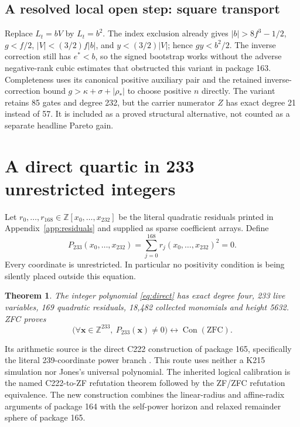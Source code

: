 \documentclass[10pt,letterpaper]{article}
\newcommand{\Z}{\mathbb Z}
\newcommand{\Con}{\operatorname{Con}}
\newtheorem{theorem}{Theorem}[section]
\theoremstyle{remark}\newtheorem{remark}[theorem]{Remark}
\begin{document}
\subsection{A resolved local open step: square transport}

Replace $L_t=bV$ by $L_t=b^2$. The index exclusion already gives
$|b|>8f^3-1/2$, $g<f/2$, $|V|<(3/2)f|b|$, and
$y<(3/2)|V|$; hence $gy<b^2/2$.
The inverse correction still has $e^*<b$, so the signed bootstrap works
without the adverse negative-rank cubic estimates that obstructed this
variant in package 163. Completeness uses its canonical positive auxiliary
pair and the retained inverse-correction bound
$g>\kappa+\sigma+|\rho_*|$ to choose positive $n$ directly.
The variant retains 85 gates and degree 232, but the carrier numerator
$Z$ has exact degree 21 instead of 57. It is included as a proved
structural alternative, not counted as a separate headline Pareto gain.

\section{A direct quartic in 233 unrestricted integers}
\label{sec:direct}

Let $r_0,\ldots,r_{168}\in\Z[x_0,\ldots,x_{232}]$ be the literal quadratic
residuals printed in Appendix~\ref{app:residuals} and supplied as sparse
coefficient arrays. Define
\begin{equation}\label{eq:direct}
 \boxed{P_{233}(x_0,\ldots,x_{232})=
              \sum_{j=0}^{168}r_j(x_0,\ldots,x_{232})^2=0.}
\end{equation}
Every coordinate is unrestricted. In particular no positivity condition
is being silently placed outside this equation.

\begin{theorem}
The integer polynomial \eqref{eq:direct} has exact degree four, 233 live
variables, 169 quadratic residuals, 18,482 collected monomials and height
5632. ZFC proves
\[
 \bigl(\forall\mathbf x\in\Z^{233},\ P_{233}(\mathbf x)\ne0\bigr)
       \longleftrightarrow\Con(\mathrm{ZFC}).
\]
\end{theorem}

Its arithmetic source is the direct C222 construction of package 165,
specifically the literal 239-coordinate power branch \cite{wide}. This
route uses neither a K215 simulation nor Jones's universal polynomial.
The inherited logical calibration is the named C222-to-ZF refutation
theorem followed by the ZF/ZFC refutation equivalence. The new construction
combines the linear-radius and affine-radix arguments of package 164 with
the self-power horizon and relaxed remainder sphere of package 165.
\end{document}
